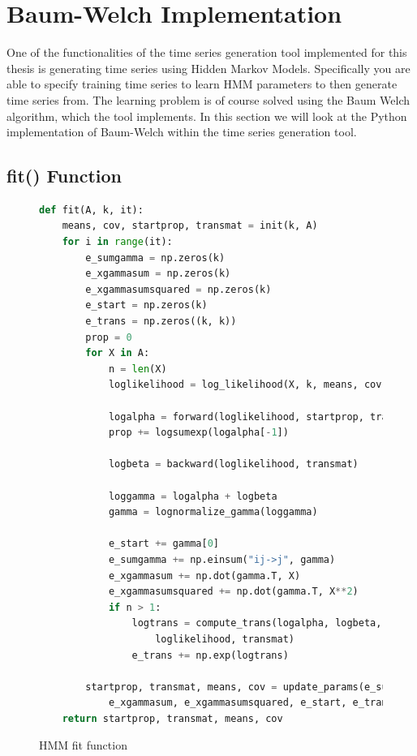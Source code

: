 
\chapter{Baum-Welch Implementation}\label{chapter:hmm-impl}

One of the functionalities of the time series generation tool implemented for this thesis is generating time series using Hidden Markov Models. Specifically you are able to specify training time series to learn HMM parameters to then generate time series from. The learning problem is of course solved using the Baum Welch algorithm, which the tool implements. In this section we will look at the Python implementation of Baum-Welch within the time series generation tool. \parencite{tsgenerator}

\section{fit() Function}

\begin{figure}
\begin{singlespace}
\begin{lstlisting}[language=Python]
def fit(A, k, it):
    means, cov, startprop, transmat = init(k, A)
    for i in range(it):
        e_sumgamma = np.zeros(k)
        e_xgammasum = np.zeros(k)
        e_xgammasumsquared = np.zeros(k)
        e_start = np.zeros(k)
        e_trans = np.zeros((k, k))
        prop = 0
        for X in A:
            n = len(X)
            loglikelihood = log_likelihood(X, k, means, cov)

            logalpha = forward(loglikelihood, startprop, transmat)
            prop += logsumexp(logalpha[-1])

            logbeta = backward(loglikelihood, transmat)

            loggamma = logalpha + logbeta
            gamma = lognormalize_gamma(loggamma)

            e_start += gamma[0]
            e_sumgamma += np.einsum("ij->j", gamma)
            e_xgammasum += np.dot(gamma.T, X)
            e_xgammasumsquared += np.dot(gamma.T, X**2)
            if n > 1:
                logtrans = compute_trans(logalpha, logbeta, \
                    loglikelihood, transmat)
                e_trans += np.exp(logtrans)

        startprop, transmat, means, cov = update_params(e_sumgamma, \
            e_xgammasum, e_xgammasumsquared, e_start, e_trans)
    return startprop, transmat, means, cov
\end{lstlisting}
\end{singlespace}
   
\caption{HMM fit function}    
\label{fig:hmm-fit-listing}
\end{figure}

